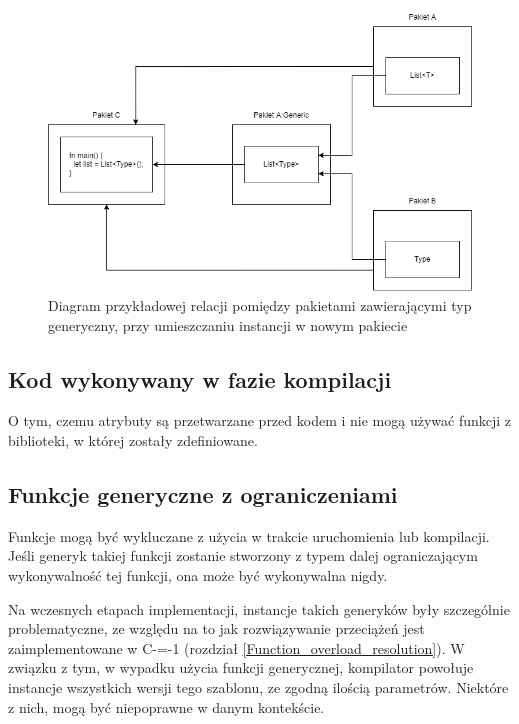 \begin{figure}
	\caption{Diagram przykładowej relacji pomiędzy pakietami zawierającymi typ generyczny, przy umieszczaniu instancji w nowym pakiecie}
	\label{generic_packages_dependencies:option:new}
	\begin{center}
		\includegraphics[width=\textwidth]{img/generics_placed_in_new.png}
	\end{center}
\end{figure}

\subsection{Kod wykonywany w fazie kompilacji}
O tym, czemu atrybuty są przetwarzane przed kodem i nie mogą używać funkcji z biblioteki, w której zostały zdefiniowane.

\subsection{Funkcje generyczne z ograniczeniami}
\label{challenges:generic_function_limitations}
Funkcje mogą być wykluczane z użycia w trakcie uruchomienia lub kompilacji. Jeśli generyk takiej funkcji zostanie stworzony z typem dalej ograniczającym wykonywalność tej funkcji, ona może być wykonywalna nigdy.

Na wczesnych etapach implementacji, instancje takich generyków były szczególnie problematyczne, ze względu na to jak rozwiązywanie przeciążeń jest zaimplementowane w C-=-1 (rozdział \ref{Function_overload_resolution}).
W związku z tym, w wypadku użycia funkcji generycznej, kompilator powołuje instancje wszystkich wersji tego szablonu, ze zgodną ilością parametrów.
Niektóre z nich, mogą być niepoprawne w danym kontekście. 

